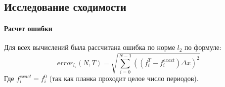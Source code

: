 \documentclass[12pt,a4paper]{article}
\begin{document}
\medskip
\\

\subsection{Исследование сходимости}
\paragraph{Расчет ошибки}
Для всех вычислений была рассчитана ошибка по норме $l_2$ по формуле:
\[
error_{l_2}(N, T)=\sqrt{\sum_{i=0}^{N-1}((f_i^T-f_i^{exact})\Delta x)^2}
\]
Где $f_i^{exact}=f_i^0$ (так как планка проходит целое число периодов).
\end{document}

